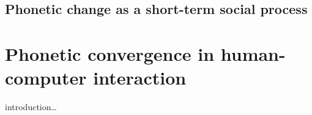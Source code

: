 \citet{Ohala1989sound}\\
\citet{Ohala1990phonetics}\\
\citet{Ohala1993phonetics}\\ %


\subsection[Short-term phonetic change]{Phonetic change as a short-term social process}
\label{subsec:phonetic_change}


\section{Phonetic convergence in human-computer interaction}
\label{sec:phonetic_convergence_inh_ci}

introduction\ldots

\citet{Weise2018looking}\\%
\citet{Lewandowski2019phonetic}\\%
\citet{Xiao2015analyzing}\\%
\citet{Cohen2017converging}\\%
\citet{DeLooze2014investigating}\\%
\citet{Priva2019limitations}\\%

